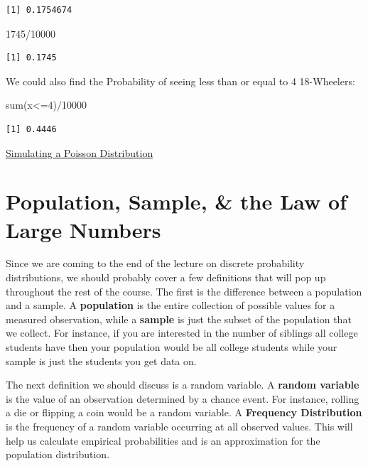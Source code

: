 \documentclass[
  letterpaper,
  DIV=11,
  numbers=noendperiod]{scrreprt}
\newenvironment{Shaded}{\begin{snugshade}}{\end{snugshade}}
\newcommand{\DecValTok}[1]{\textcolor[rgb]{0.68,0.00,0.00}{#1}}
\newcommand{\FunctionTok}[1]{\textcolor[rgb]{0.28,0.35,0.67}{#1}}
\newcommand{\NormalTok}[1]{\textcolor[rgb]{0.00,0.23,0.31}{#1}}
\newcommand{\SpecialCharTok}[1]{\textcolor[rgb]{0.37,0.37,0.37}{#1}}
\begin{document}
\begin{verbatim}
[1] 0.1754674
\end{verbatim}

\begin{Shaded}
\begin{Highlighting}[]
\DecValTok{1745}\SpecialCharTok{/}\DecValTok{10000}
\end{Highlighting}
\end{Shaded}

\begin{verbatim}
[1] 0.1745
\end{verbatim}

We could also find the Probability of seeing less than or equal to 4
18-Wheelers:

\begin{Shaded}
\begin{Highlighting}[]
\FunctionTok{sum}\NormalTok{(x}\SpecialCharTok{\textless{}=}\DecValTok{4}\NormalTok{)}\SpecialCharTok{/}\DecValTok{10000}
\end{Highlighting}
\end{Shaded}

\begin{verbatim}
[1] 0.4446
\end{verbatim}

\begin{watch}{}{}
    \href{https://youtu.be/RsaVDiUv5C0}{Simulating a Poisson Distribution}
\end{watch}

\section{Population, Sample, \& the Law of Large
Numbers}\label{population-sample-the-law-of-large-numbers}

Since we are coming to the end of the lecture on discrete probability
distributions, we should probably cover a few definitions that will pop
up throughout the rest of the course. The first is the difference
between a population and a sample. A \textbf{population} is the entire
collection of possible values for a measured observation, while a
\textbf{sample} is just the subset of the population that we collect.
For instance, if you are interested in the number of siblings all
college students have then your population would be all college students
while your sample is just the students you get data on.

The next definition we should discuss is a random variable. A
\textbf{random variable} is the value of an observation determined by a
chance event. For instance, rolling a die or flipping a coin would be a
random variable. A \textbf{Frequency Distribution} is the frequency of a
random variable occurring at all observed values. This will help us
calculate empirical probabilities and is an approximation for the
population distribution.
\end{document}
